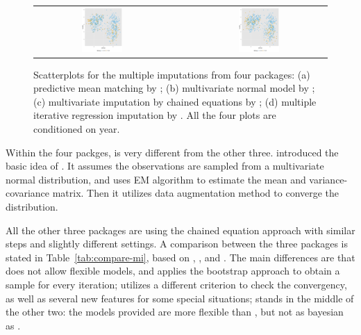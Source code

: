 \documentclass[article]{jss}
\begin{document}
\begin{center}
\begin{figure}[h]
\begin{centering}
\begin{tabular}{cccc}
\includegraphics[width=0.32\textwidth]{graph/fig3-8-mice-2} &  &  & \includegraphics[width=0.32\textwidth]{graph/fig3-9-mi-2}\tabularnewline
\end{tabular}
\par\end{centering}
\caption{Scatterplots for the multiple imputations from four  packages: (a) predictive mean matching by ; (b) multivariate normal model by ; (c) multivariate imputation by chained equations by ; (d) multiple iterative regression imputation by . All the four plots are conditioned on year.}
\label{fig:multiple-imputation}
\end{figure}
\par\end{center}

Within the four packges,  is very different from the other three. \citet{schafer1998multiple} introduced the basic idea of . It assumes the observations are sampled from a multivariate normal distribution, and uses EM algorithm to estimate the mean and variance-covariance matrix. Then it utilizes data augmentation method to converge the distribution. 

All the other three packages are using the chained equation approach with similar steps and slightly different settings. A comparison between the three packages is stated in Table~\ref{tab:compare-mi}, based on \citet{hmisc}, \citet{mice}, and \citet{mi}. The main differences are that  does not allow flexible models, and applies the bootstrap approach to obtain a sample for every iteration;  utilizes a different criterion to check the convergency, as well as several new features for some special situations;  stands in the middle of the other two: the models provided are more flexible than , but not as bayesian as .
\end{document}
